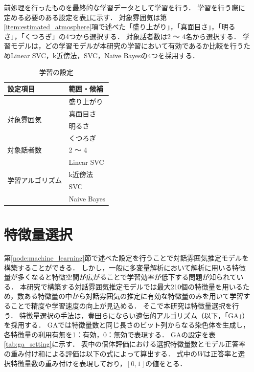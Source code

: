 前処理を行ったものを最終的な学習データとして学習を行う．
学習を行う際に定める必要のある設定を表\ref{tab:learning_setting}に示す．
対象雰囲気は第\ref{item:estimated_atmosphere}項で述べた「盛り上がり」，「真面目さ」，「明るさ」，「くつろぎ」の4つから選択する．
対象話者数は2 〜 4名から選択する．
学習モデルは，どの学習モデルが本研究の学習において有効であるか比較を行うためLinear SVC，k近傍法，SVC，Naïve Bayesの4つを採用する．

\begin{table}[t]
    \caption{学習の設定}
    \centering
    \begin{tabular}{ll}
        \hline
        設定項目 & 範囲・候補 \\ \hline\hline
        \multirow{4}{*}{対象雰囲気} & 盛り上がり \\
        & 真面目さ \\
        & 明るさ \\
        & くつろぎ \\ \hline
        対象話者数 & 2 〜 4 \\ \hline
        \multirow{4}{*}{学習アルゴリズム} & Linear SVC \\
        & k近傍法 \\
        & SVC \\
        & Naive Bayes \\ \hline
    \end{tabular}
    \label{tab:learning_setting}
\end{table}

\section{特徴量選択\label{node:ga}}

第\ref{node:machine_learning}節で述べた設定を行うことで対話雰囲気推定モデルを構築することができる．
しかし，一般に多変量解析において解析に用いる特徴量が多くなると特徴空間が広がることで学習効率が低下する問題が知られている．
本研究で構築する対話雰囲気推定モデルでは最大210個の特徴量を用いるため，数ある特徴量の中から対話雰囲気の推定に有効な特徴量のみを用いて学習することで精度や学習速度の向上が見込める．
そこで本研究は特徴量選択を行う．
特徴量選択の手法は，豊田らにならい遺伝的アルゴリズム（以下，「GA」）を採用する．
GAでは特徴量数と同じ長さのビット列からなる染色体を生成し，各特徴量の利用有無を1：有効，0：無効で表現する．
GAの設定を表\ref{tab:ga_setting}に示す．
表中の個体評価における選択特徴量数とモデル正答率の重み付け和による評価は以下の式によって算出する．
式中の$W$は正答率と選択特徴量数の重み付けを表現しており，$[0, 1]$の値をとる．

